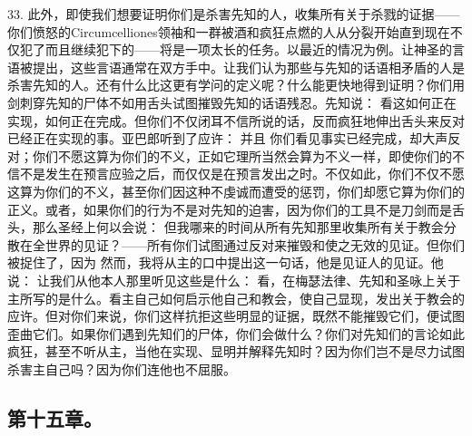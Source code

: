 33. 此外，即使我们想要证明你们是杀害先知的人，收集所有关于杀戮的证据——你们愤怒的Circumcelliones领袖和一群被酒和疯狂点燃的人从分裂开始直到现在不仅犯了而且继续犯下的——将是一项太长的任务。以最近的情况为例。让神圣的言语被提出，这些言语通常在双方手中。让我们认为那些与先知的话语相矛盾的人是杀害先知的人。还有什么比这更有学问的定义呢？什么能更快地得到证明？你们用剑刺穿先知的尸体不如用舌头试图摧毁先知的话语残忍。先知说： 看这如何正在实现，如何正在完成。但你们不仅闭耳不信所说的话，反而疯狂地伸出舌头来反对已经正在实现的事。亚巴郎听到了应许： 并且 你们看见事实已经完成，却大声反对；你们不愿这算为你们的不义，正如它理所当然会算为不义一样，即使你们的不信不是发生在预言应验之后，而仅仅是在预言发出之时。不仅如此，你们不仅不愿这算为你们的不义，甚至你们因这种不虔诚而遭受的惩罚，你们却愿它算为你们的正义。或者，如果你们的行为不是对先知的迫害，因为你们的工具不是刀剑而是舌头，那么圣经上何以会说： 但我哪来的时间从所有先知那里收集所有关于教会分散在全世界的见证？——所有你们试图通过反对来摧毁和使之无效的见证。但你们被捉住了，因为 然而，我将从主的口中提出这一句话，他是见证人的见证。他说： 让我们从他本人那里听见这些是什么： 看，在梅瑟法律、先知和圣咏上关于主所写的是什么。看主自己如何启示他自己和教会，使自己显现，发出关于教会的应许。但对你们来说，你们这样抗拒这些明显的证据，既然不能摧毁它们，便试图歪曲它们。如果你们遇到先知们的尸体，你们会做什么？你们对先知们的言论如此疯狂，甚至不听从主，当他在实现、显明并解释先知时？因为你们岂不是尽力试图杀害主自己吗？因为你们连他也不屈服。\par


\subsection{第十五章。}

\par

